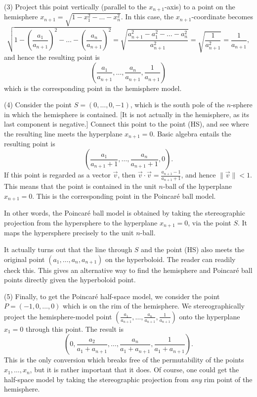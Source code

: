 \documentclass[leqno]{book}
\begin{document}
(3) Project this point vertically (parallel to the $x_{n+1}$-axis) to a point on the hemisphere $x_{n+1}=\sqrt{1-x_1^2-\dots-x_n^2}$.  In this case, the $x_{n+1}$-coordinate becomes
$$\sqrt{1-\left(\frac{a_1}{a_{n+1}}\right)^2-\dots-\left(\frac{a_n}{a_{n+1}}\right)^2}=\sqrt{\frac{a_{n+1}^2-a_1^2-\dots-a_n^2}{a_{n+1}^2}}=\sqrt{\frac 1{a_{n+1}^2}}=\frac 1{a_{n+1}},$$
and hence the resulting point is
\begin{equation}\tag{HS}\left(\frac{a_1}{a_{n+1}},\dots,\frac{a_n}{a_{n+1}},\frac 1{a_{n+1}}\right)\end{equation}
which is the corresponding point in the hemisphere model.

(4) Consider the point $S=(0,\dots,0,-1)$, which is the south pole of the $n$-sphere in which the hemisphere is contained.  [It is not actually in the hemisphere, as its last component is negative.]  Connect this point to the point (HS), and see where the resulting line meets the hyperplane $x_{n+1}=0$.  Basic algebra entails the resulting point is
$$\left(\frac{a_1}{a_{n+1}+1},\dots,\frac{a_n}{a_{n+1}+1},0\right).$$
If this point is regarded as a vector $\vec v$, then $\vec v\cdot\vec v=\frac{a_{n+1}-1}{a_{n+1}+1}$, and hence $\|\vec v\|<1$.  This means that the point is contained in the unit $n$-ball of the hyperplane $x_{n+1}=0$.  This is the corresponding point in the Poincar\'e ball model.

In other words, the Poincar\'e ball model is obtained by taking the stereographic projection from the hypersphere to the hyperplane $x_{n+1}=0$, via the point $S$.  It maps the hypersphere precisely to the unit $n$-ball.

It actually turns out that the line through $S$ and the point (HS) also meets the original point $(a_1,\dots,a_n,a_{n+1})$ on the hyperboloid.  The reader can readily check this.  This gives an alternative way to find the hemisphere and Poincar\'e ball points directly given the hyperboloid point.

(5) Finally, to get the Poincar\'e half-space model, we consider the point $P=(-1,0,\dots,0)$ which is on the rim of the hemisphere.  We stereographically project the hemisphere-model point $\left(\frac{a_1}{a_{n+1}},\dots,\frac{a_n}{a_{n+1}},\frac 1{a_{n+1}}\right)$ onto the hyperplane $x_1=0$ through this point.  The result is
$$\left(0,\frac{a_2}{a_1+a_{n+1}},\dots,\frac{a_n}{a_1+a_{n+1}},\frac 1{a_1+a_{n+1}}\right).$$
This is the only conversion which breaks free of the permutability of the points $x_1,\dots,x_n$, but it is rather important that it does.  Of course, one could get the half-space model by taking the stereographic projection from \emph{any} rim point of the hemisphere.\\
\end{document}
